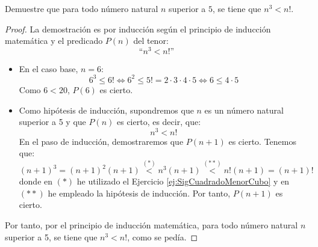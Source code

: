 \begin{ejercicio}
    Demuestre que para todo número natural $n$ superior a $5$, se tiene que $n^3<n!$.

    \begin{proof}
        La demostración es por inducción según el principio de inducción matemática y el predicado $P(n)$ del tenor:
    \begin{equation*}
        \text{``}n^3<n!\text{''}
    \end{equation*}

    \begin{itemize}
        \item En el caso base, $n=6$:
            \begin{equation*}
                6^3 \leq 6! \Longleftrightarrow 6^2\leq 5!=2\cdot 3\cdot 4\cdot 5 \Longleftrightarrow 6 \leq 4\cdot 5
            \end{equation*}
            Como $6 < 20$, $P(6)$ es cierto.

        \item Como hipótesis de inducción, supondremos que $n$ es un número natural superior a 5 y que $P(n)$ es cierto, es decir, que:
            \begin{equation*}
                n^3<n!
            \end{equation*}
            En el paso de inducción, demostraremos que $P(n+1)$ es cierto. Tenemos que:
            \begin{equation*}
                (n+1)^3 = (n+1)^2(n+1) \stackrel{(\ast)}{<{}} n^3(n+1) \stackrel{(\ast\ast)}{<{}} n!(n+1) = (n+1)!
            \end{equation*}
            donde en $(\ast)$ he utilizado el Ejercicio \ref{ej:SigCuadradoMenorCubo} y en $(\ast\ast)$ he empleado la hipótesis de inducción.
            Por tanto, $P(n+1)$ es cierto.
    \end{itemize}
    Por tanto, por el principio de inducción matemática, para todo número natural $n$ superior a 5, se tiene que $n^3<n!$, como se pedía.
    \end{proof}
\end{ejercicio}

